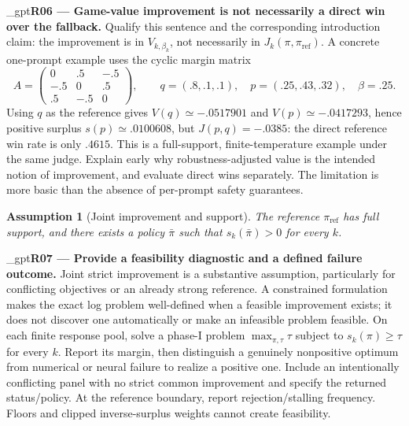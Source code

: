 \documentclass{article}
\makeatletter
\newif\ifshowreviews
\let\revieworiginalref\ref
\newcommand{\reviewref}[1]{%
  \@ifundefined{r@#1}{\textnormal{[original-draft ref.: \texttt{\detokenize{#1}}]}}%
  {\revieworiginalref{#1}}}
\let\ref\reviewref
\newcommand{\reviewresponse}[1]{%
  \ifshowreviews
  \par\begingroup\color{blue!65!black}\hypersetup{allcolors=blue!65!black}\emergencystretch=2em%
  \noindent\textbf{Response:} #1\par\endgroup
  \fi}
\newtheorem{assumption}{Assumption}
\theoremstyle{remark}
\theoremstyle{plain}
\newcommand{\piref}{\pi_{\mathrm{ref}}}
\makeatother
\begin{document}
\kekim_gpt{\textbf{R06 --- Game-value improvement is not necessarily a direct win over the fallback.} Qualify this sentence and the corresponding introduction claim: the improvement is in $V_{k,\beta_k}$, not necessarily in $J_k(\pi,\piref)$. A concrete one-prompt example uses the cyclic margin matrix
\[
A=\begin{pmatrix}0&.5&-.5\\-.5&0&.5\\.5&-.5&0\end{pmatrix},\qquad
q=(.8,.1,.1),\quad p=(.25,.43,.32),\quad\beta=.25.
\]
Using $q$ as the reference gives $V(q)\simeq-.0517901$ and $V(p)\simeq-.0417293$, hence positive surplus $s(p)\simeq.0100608$, but $J(p,q)=-.0385$: the direct reference win rate is only $.4615$. This is a full-support, finite-temperature example under the same judge. Explain early why robustness-adjusted value is the intended notion of improvement, and evaluate direct wins separately. The limitation is more basic than the absence of per-prompt safety guarantees.}
\reviewresponse{\textbf{R06 --- Addressed.} The introduction explicitly limits improvement to adaptive game values and separates direct reference wins. Appendix~\ref{app:game-versus-direct} now includes the full-support finite-temperature counterexample, with positive surplus but direct win probability $0.4615$.}


\begin{assumption}[Joint improvement and support]
\label{ass:joint}
The reference $\piref$ has full support, and there exists a policy $\bar\pi$ such that $s_k(\bar\pi)>0$ for every $k$.
\end{assumption}

\kekim_gpt{\textbf{R07 --- Provide a feasibility diagnostic and a defined failure outcome.} Joint strict improvement is a substantive assumption, particularly for conflicting objectives or an already strong reference. A constrained formulation makes the exact log problem well-defined when a feasible improvement exists; it does not discover one automatically or make an infeasible problem feasible. On each finite response pool, solve a phase-I problem $\max_{\pi,\tau}\tau$ subject to $s_k(\pi)\ge\tau$ for every $k$. Report its margin, then distinguish a genuinely nonpositive optimum from numerical or neural failure to realize a positive one. Include an intentionally conflicting panel with no strict common improvement and specify the returned status/policy. At the reference boundary, report rejection/stalling frequency. Floors and clipped inverse-surplus weights cannot create feasibility.}
\reviewresponse{\textbf{R07 --- Partially addressed.} Appendix~\ref{app:feasibility} defines a finite-pool maximum-margin feasibility audit, an analytic conflicting example, distinct failure statuses, and retention of the previous policy on uncertified output. Measured feasibility margins and boundary rejection/stalling rates still require execution artifacts; the constrained formulation is not claimed to create feasibility.}
\end{document}
